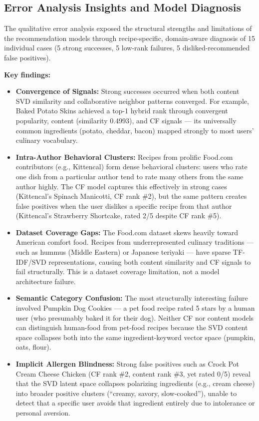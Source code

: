 \documentclass[11pt,a4paper]{article}
\begin{document}
\subsection{Error Analysis Insights and Model Diagnosis}
The qualitative error analysis exposed the structural strengths and limitations of the recommendation models through recipe-specific, domain-aware diagnosis of 15 individual cases (5 strong successes, 5 low-rank failures, 5 disliked-recommended false positives).

\textbf{Key findings:}
\begin{itemize}
    \item \textbf{Convergence of Signals:} Strong successes occurred when both content SVD similarity and collaborative neighbor patterns converged. For example, Baked Potato Skins achieved a top-1 hybrid rank through convergent popularity, content (similarity 0.4993), and CF signals --- its universally common ingredients (potato, cheddar, bacon) mapped strongly to most users' culinary vocabulary.

    \item \textbf{Intra-Author Behavioral Clusters:} Recipes from prolific Food.com contributors (e.g., Kittencal) form dense behavioral clusters: users who rate one dish from a particular author tend to rate many others from the same author highly. The CF model captures this effectively in strong cases (Kittencal's Spinach Manicotti, CF rank \#2), but the same pattern creates false positives when the user dislikes a specific recipe from that author (Kittencal's Strawberry Shortcake, rated 2/5 despite CF rank \#5).

    \item \textbf{Dataset Coverage Gaps:} The Food.com dataset skews heavily toward American comfort food. Recipes from underrepresented culinary traditions --- such as hummus (Middle Eastern) or Japanese teriyaki --- have sparse TF-IDF/SVD representations, causing both content similarity and CF signals to fail structurally. This is a dataset coverage limitation, not a model architecture failure.

    \item \textbf{Semantic Category Confusion:} The most structurally interesting failure involved Pumpkin Dog Cookies --- a pet food recipe rated 5 stars by a human user (who presumably baked it for their dog). Neither CF nor content models can distinguish human-food from pet-food recipes because the SVD content space collapses both into the same ingredient-keyword vector space (pumpkin, oats, flour).

    \item \textbf{Implicit Allergen Blindness:} Strong false positives such as Crock Pot Cream Cheese Chicken (CF rank \#2, content rank \#3, yet rated 0/5) reveal that the SVD latent space collapses polarizing ingredients (e.g., cream cheese) into broader positive clusters (``creamy, savory, slow-cooked''), unable to detect that a specific user avoids that ingredient entirely due to intolerance or personal aversion.
\end{itemize}
\end{document}
